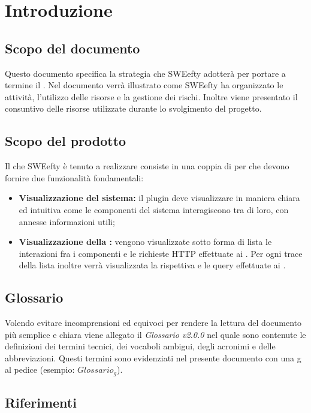
\section{Introduzione}
	\subsection{Scopo del documento}
	Questo documento specifica la strategia che SWEefty adotterà per portare a termine il .
	Nel documento verrà illustrato come SWEefty ha organizzato le attività, l'utilizzo delle risorse e la gestione dei rischi.
	Inoltre viene presentato il consuntivo delle risorse utilizzate durante lo svolgimento del progetto.
	
	\subsection{Scopo del prodotto}
Il  che SWEefty è tenuto a realizzare consiste in una coppia di  per  che devono fornire due funzionalità fondamentali:
\begin{itemize}
	\item \textbf{Visualizzazione  del sistema:} il plugin deve visualizzare in maniera chiara ed intuitiva come le componenti del sistema interagiscono tra di loro, con annesse informazioni utili;
	\item \textbf{Visualizzazione della :} vengono visualizzate sotto forma di lista le interazioni fra i componenti e le richieste HTTP effettuate ai . Per ogni trace della lista inoltre verrà visualizzata la rispettiva  e le query effettuate ai .
\end{itemize}

\subsection{Glossario}
Volendo evitare incomprensioni  ed equivoci per rendere la lettura del documento più semplice e chiara viene allegato il \emph{Glossario v2.0.0} nel quale sono contenute le definizioni dei termini tecnici, dei vocaboli ambigui, degli acronimi e delle abbreviazioni. Questi termini sono evidenziati nel presente documento con una g al pedice (esempio: $Glossario_{g}$).
	
	\subsection{Riferimenti}
